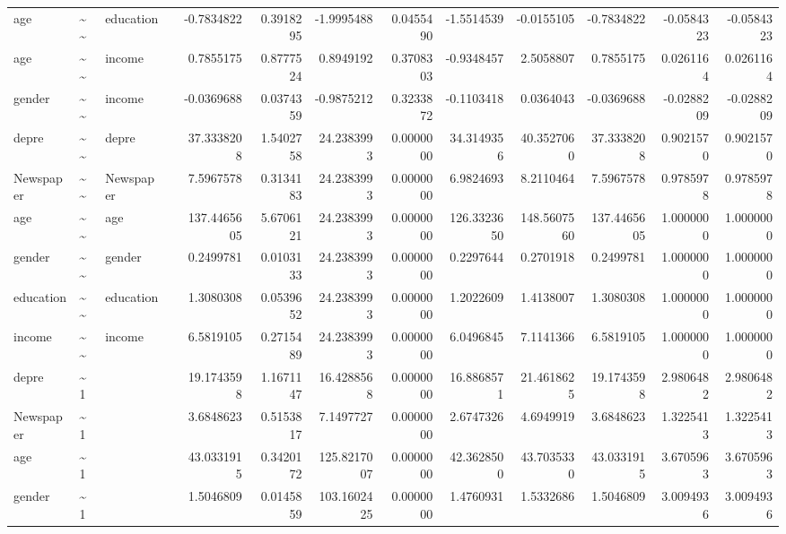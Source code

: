 \documentclass[
]{article}
\begin{document}
\begin{table}[!h]
\begin{tabular}[t]{llllrrrrrrrrr}
age & \textasciitilde{}\textasciitilde{} & education &  & -0.7834822 & 0.3918295 & -1.9995488 & 0.0455490 & -1.5514539 & -0.0155105 & -0.7834822 & -0.0584323 & -0.0584323\\
age & \textasciitilde{}\textasciitilde{} & income &  & 0.7855175 & 0.8777524 & 0.8949192 & 0.3708303 & -0.9348457 & 2.5058807 & 0.7855175 & 0.0261164 & 0.0261164\\
gender & \textasciitilde{}\textasciitilde{} & income &  & -0.0369688 & 0.0374359 & -0.9875212 & 0.3233872 & -0.1103418 & 0.0364043 & -0.0369688 & -0.0288209 & -0.0288209\\
\addlinespace
depre & \textasciitilde{}\textasciitilde{} & depre &  & 37.3338208 & 1.5402758 & 24.2383993 & 0.0000000 & 34.3149356 & 40.3527060 & 37.3338208 & 0.9021570 & 0.9021570\\
Newspaper & \textasciitilde{}\textasciitilde{} & Newspaper &  & 7.5967578 & 0.3134183 & 24.2383993 & 0.0000000 & 6.9824693 & 8.2110464 & 7.5967578 & 0.9785978 & 0.9785978\\
age & \textasciitilde{}\textasciitilde{} & age &  & 137.4465605 & 5.6706121 & 24.2383993 & 0.0000000 & 126.3323650 & 148.5607560 & 137.4465605 & 1.0000000 & 1.0000000\\
gender & \textasciitilde{}\textasciitilde{} & gender &  & 0.2499781 & 0.0103133 & 24.2383993 & 0.0000000 & 0.2297644 & 0.2701918 & 0.2499781 & 1.0000000 & 1.0000000\\
education & \textasciitilde{}\textasciitilde{} & education &  & 1.3080308 & 0.0539652 & 24.2383993 & 0.0000000 & 1.2022609 & 1.4138007 & 1.3080308 & 1.0000000 & 1.0000000\\
\addlinespace
income & \textasciitilde{}\textasciitilde{} & income &  & 6.5819105 & 0.2715489 & 24.2383993 & 0.0000000 & 6.0496845 & 7.1141366 & 6.5819105 & 1.0000000 & 1.0000000\\
depre & \textasciitilde{}1 &  &  & 19.1743598 & 1.1671147 & 16.4288568 & 0.0000000 & 16.8868571 & 21.4618625 & 19.1743598 & 2.9806482 & 2.9806482\\
Newspaper & \textasciitilde{}1 &  &  & 3.6848623 & 0.5153817 & 7.1497727 & 0.0000000 & 2.6747326 & 4.6949919 & 3.6848623 & 1.3225413 & 1.3225413\\
age & \textasciitilde{}1 &  &  & 43.0331915 & 0.3420172 & 125.8217007 & 0.0000000 & 42.3628500 & 43.7035330 & 43.0331915 & 3.6705963 & 3.6705963\\
gender & \textasciitilde{}1 &  &  & 1.5046809 & 0.0145859 & 103.1602425 & 0.0000000 & 1.4760931 & 1.5332686 & 1.5046809 & 3.0094936 & 3.0094936\\

\end{tabular}
\end{table}
\end{document}
